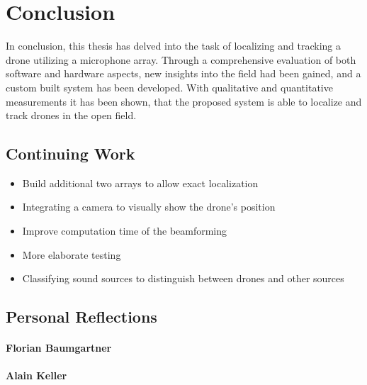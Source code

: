\chapter{Conclusion}
In conclusion, this thesis has delved into the task of 
localizing and tracking a drone utilizing a microphone array. 
Through a comprehensive evaluation of both software and hardware aspects,
new insights into the field had been gained, and
a custom built system has been developed.
With qualitative and quantitative measurements it has been shown, 
that the proposed system is able to localize and track 
drones in the open field.

\section{Continuing Work}

\bigskip
\begin{itemize}
		\item Build additional two arrays to allow exact localization
		\item Integrating a camera to visually show the drone's position
		\item Improve computation time of the beamforming
		\item More elaborate testing
		\item Classifying sound sources to distinguish between drones and other sources
\end{itemize}
\newpage

\newpage
\section{Personal Reflections}
\subsubsection{Florian Baumgartner}

\subsubsection{Alain Keller}
